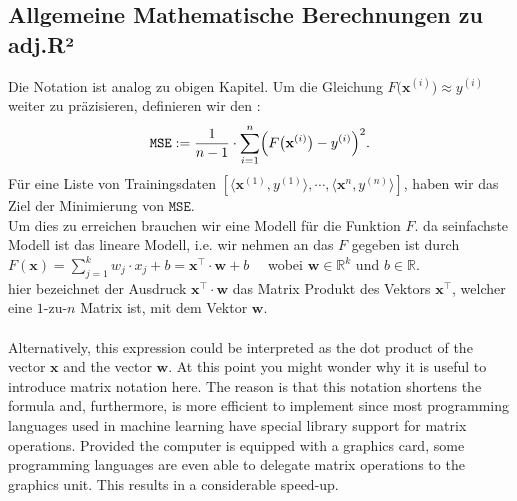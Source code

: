 \documentclass[12pt]{article}
\begin{document}
\subsection{Allgemeine Mathematische Berechnungen zu adj.R²}
%
Die Notation ist analog zu obigen Kapitel. Um die Gleichung $F\bigl(\mathbf{x}^{(i)}\bigr) \approx y^{(i)}$ weiter zu präzisieren, definieren wir den {\color{blue}{gemittelten quadratischen Fehler "mean squared error"}}: 
\begin{equation}
  \label{eq:squared-error-1}
  \mathtt{MSE} := \frac{1}{n-1} \cdot \sum\limits_{i=1}^{n} \Bigl(F\bigl(\mathbf{x}^{(i)}\bigr) - y^{(i)}\Bigr)^2. 
\end{equation}
Für eine Liste von Trainingsdaten $[\langle \mathbf{x}^{(1)}, y^{(1)} \rangle, \cdots, \langle \mathbf{x}^{n}, y^{(n)} \rangle] $, haben wir das Ziel der Minimierung von $\mathtt{MSE}$.\\  
Um dies zu erreichen brauchen wir eine Modell für die Funktion $F$.  da seinfachste Modell ist das lineare Modell, i.e. wir nehmen an das  $F$ gegeben ist durch \\[0.2cm]
\hspace*{1.3cm}
$ F(\mathbf{x}) =  \sum\limits_{j=1}^k w_j \cdot x_j + b  =  \mathbf{x^\top} \cdot \mathbf{w} + b  \quad $ 
wobei $ \mathbf{w} \in {\mathbb{R}^k}$ und $ {b\in\mathbb{R}} $.
\\[0.2cm]
hier bezeichnet der Ausdruck $\mathbf{x}^\top \cdot \mathbf{w}$ das Matrix Produkt des Vektors $\mathbf{x}^\top$, welcher eine $1$-zu-$n$ Matrix ist, mit dem Vektor $\mathbf{w}$.  \\

{\color{red}{***********************************************************************\\ 
Ab hier weiter nach Deutsch übersetzen.......\\
************************************************************************}}\\[0.2cm]

 
Alternatively, this expression could be interpreted as the dot product of the vector $\mathbf{x}$ and the vector $\mathbf{w}$.
At this point you might wonder why it is useful to introduce matrix notation here.  The reason is
that this notation shortens the formula and, furthermore, is more efficient to implement since most
programming languages used in machine learning have special library support for matrix operations.  
Provided the computer is equipped with a graphics card,  some
programming languages are even able to delegate matrix operations to the graphics unit.  This results in a
considerable speed-up.
\end{document}

